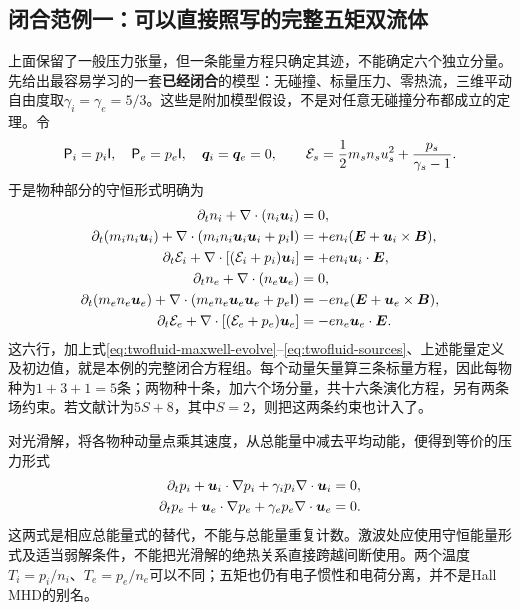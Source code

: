 \subsection{闭合范例一：可以直接照写的完整五矩双流体}
\label{sec:full-five-moment}
上面保留了一般压力张量，但一条能量方程只确定其迹，不能确定六个独立分量。先给出最容易学习的一套\textbf{已经闭合}的模型：无碰撞、标量压力、零热流，三维平动自由度取$\gamma_i=\gamma_e=5/3$。这些是附加模型假设，不是对任意无碰撞分布都成立的定理。令
\begin{equation}
 \mathsf P_i=p_i\mathsf I,\quad \mathsf P_e=p_e\mathsf I,\quad
 \bm{q}_i=\bm{q}_e=0,\qquad
 \mathcal E_s=\frac12m_sn_su_s^2+\frac{p_s}{\gamma_s-1}.
\end{equation}
于是物种部分的守恒形式明确为
\begin{align}
 \partial_t n_i+\nabla\cdot(n_i\bm{u}_i)&=0,\\
 \partial_t(m_in_i\bm{u}_i)+\nabla\cdot(m_in_i\bm{u}_i\bm{u}_i+p_i\mathsf I)
 &=+en_i(\bm{E}+\bm{u}_i\times\bm{B}),\\
 \partial_t\mathcal E_i+\nabla\cdot[(\mathcal E_i+p_i)\bm{u}_i]
 &=+en_i\bm{u}_i\cdot\bm{E},\\
 \partial_t n_e+\nabla\cdot(n_e\bm{u}_e)&=0,\\
 \partial_t(m_en_e\bm{u}_e)+\nabla\cdot(m_en_e\bm{u}_e\bm{u}_e+p_e\mathsf I)
 &=-en_e(\bm{E}+\bm{u}_e\times\bm{B}),\\
 \partial_t\mathcal E_e+\nabla\cdot[(\mathcal E_e+p_e)\bm{u}_e]
 &=-en_e\bm{u}_e\cdot\bm{E}.
 \label{eq:closed-five-species}
\end{align}
这六行，加上式\eqref{eq:twofluid-maxwell-evolve}--\eqref{eq:twofluid-sources}、上述能量定义及初边值，就是本例的完整闭合方程组。每个动量矢量算三条标量方程，因此每物种为$1+3+1=5$条；两物种十条，加六个场分量，共十六条演化方程，另有两条场约束。若文献计为$5S+8$，其中$S=2$，则把这两条约束也计入了。

对光滑解，将各物种动量点乘其速度，从总能量中减去平均动能，便得到等价的压力形式
\begin{align}
 \partial_t p_i+\bm{u}_i\cdot\nabla p_i+\gamma_i p_i\nabla\cdot\bm{u}_i&=0,\\
 \partial_t p_e+\bm{u}_e\cdot\nabla p_e+\gamma_e p_e\nabla\cdot\bm{u}_e&=0.
 \label{eq:twofluid-adiabatic}
\end{align}
这两式是相应总能量式的替代，不能与总能量重复计数。激波处应使用守恒能量形式及适当弱解条件，不能把光滑解的绝热关系直接跨越间断使用。两个温度
$T_i=p_i/n_i$、$T_e=p_e/n_e$可以不同；五矩也仍有电子惯性和电荷分离，并不是Hall MHD的别名。

